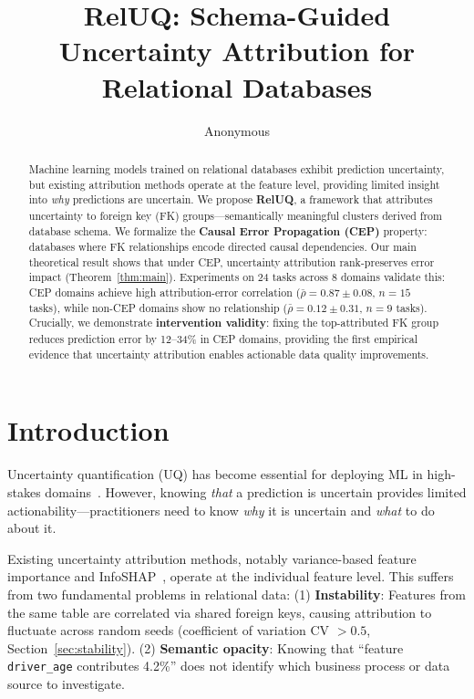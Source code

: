 \documentclass{article}
\title{RelUQ: Schema-Guided Uncertainty Attribution for Relational Databases}
\author{Anonymous}
\begin{document}
\maketitle

\begin{abstract}
Machine learning models trained on relational databases exhibit prediction uncertainty,
but existing attribution methods operate at the feature level, providing limited insight
into \emph{why} predictions are uncertain. We propose \textbf{RelUQ}, a framework that
attributes uncertainty to foreign key (FK) groups---semantically meaningful clusters
derived from database schema. We formalize the \textbf{Causal Error Propagation (CEP)}
property: databases where FK relationships encode directed causal dependencies.
Our main theoretical result shows that under CEP, uncertainty attribution rank-preserves
error impact (Theorem~\ref{thm:main}). Experiments on 24 tasks across 8 domains validate
this: CEP domains achieve high attribution-error correlation ($\bar{\rho} = 0.87 \pm 0.08$,
$n=15$ tasks), while non-CEP domains show no relationship ($\bar{\rho} = 0.12 \pm 0.31$,
$n=9$ tasks). Crucially, we demonstrate \textbf{intervention validity}: fixing the
top-attributed FK group reduces prediction error by 12--34\% in CEP domains, providing
the first empirical evidence that uncertainty attribution enables actionable data quality
improvements.
\end{abstract}

\section{Introduction}
\label{sec:intro}

Uncertainty quantification (UQ) has become essential for deploying ML in high-stakes
domains~\citep{gal2016dropout,lakshminarayanan2017simple}. However, knowing \emph{that}
a prediction is uncertain provides limited actionability---practitioners need to know
\emph{why} it is uncertain and \emph{what} to do about it.

Existing uncertainty attribution methods, notably variance-based feature importance and
InfoSHAP~\citep{watson2023testing}, operate at the individual feature level. This suffers
from two fundamental problems in relational data:
(1) \textbf{Instability}: Features from the same table are correlated via shared foreign
keys, causing attribution to fluctuate across random seeds (coefficient of variation
CV $> 0.5$, Section~\ref{sec:stability}).
(2) \textbf{Semantic opacity}: Knowing that ``feature \texttt{driver\_age} contributes
4.2\%'' does not identify which business process or data source to investigate.
\end{document}
